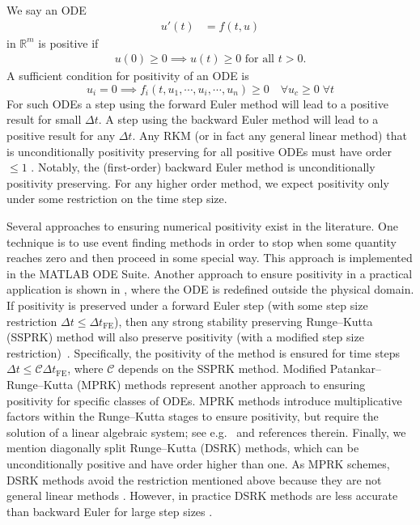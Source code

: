 \documentclass[a4paper]{article}
\numberwithin{equation}{section}
\theoremstyle{plain}
\theoremstyle{definition}
\numberwithin{theorem}{section}
\newcommand{\R}{\mathbb{R}}
\newcommand{\dt}{{\Delta t}}
\newcommand{\1}{\mathbbm{1}}
\begin{document}
We say an ODE
\begin{align} \label{ode}
    u'(t) & = f(t,u)
\end{align}
in $\R^m$ is positive if
\begin{align} \label{continuous-positivity}
    u(0)\ge 0 \implies u(t) \ge 0 \text{ for all } t>0.
\end{align}
A sufficient condition for positivity of an ODE is
\begin{equation} \label{eq:condition_ODE_pos}
u_i=0 \implies f_i(t,u_1,\cdots,u_i,\cdots,u_n) \geq 0 \quad \forall {u_c \geq 0}\; \forall {t}
\end{equation}
For such ODEs a step using the forward Euler method will lead to a positive result for small $\dt$.
A step using the backward Euler method will lead to a positive result for any $\dt$.
Any RKM (or in fact any general linear method) that is unconditionally positivity preserving for all positive ODEs
must have order $\le 1$ \cite{bolley_conservation_1978}. Notably, the (first-order)
backward Euler method is unconditionally positivity preserving.
For any higher order method, we expect positivity only under some restriction
on the time step size.

Several approaches to ensuring numerical positivity exist in the literature.
One technique is to use event finding methods in order to stop when some quantity
reaches zero and then proceed in some special way. This approach is implemented in the MATLAB ODE Suite.
Another approach to ensure positivity in a practical application is shown in
\cite{shampine_non-negative_2005}, where the ODE is redefined outside the
physical domain.
If positivity is preserved under a forward Euler step (with
some step size restriction $\dt \le \dt_\text{FE}$), then any strong stability preserving Runge--Kutta (SSPRK)
method will also preserve positivity (with a modified step size restriction)~\cite{gottlieb_strong_2011}.
Specifically, the positivity of the method is ensured for time steps
$\dt \leq {\mathcal C} \dt_\text{FE}$, where ${\mathcal C}$ depends on the SSPRK method.
Modified Patankar--Runge--Kutta (MPRK) methods represent another approach to ensuring
positivity for specific classes of ODEs. MPRK methods introduce multiplicative
factors within the Runge--Kutta stages to ensure positivity, but require the solution
of a linear algebraic system; see e.g.\ \cite{kopecz_comparison_2019} and references therein.
Finally, we mention diagonally split Runge--Kutta (DSRK) methods, which can be unconditionally
positive and have order higher than one. As MPRK schemes, DSRK methods avoid
the restriction mentioned above because
they are not general linear methods \cite{horvath_positivity_1998}.  However, in practice DSRK
methods are less accurate than backward Euler for large step sizes \cite{macdonald2007}.
\end{document}

